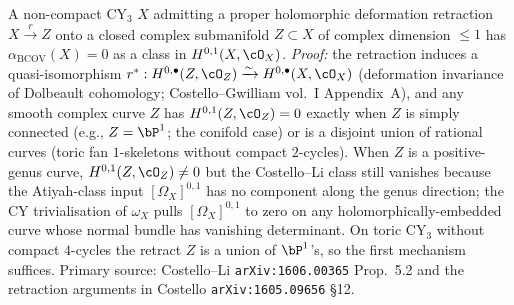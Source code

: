 \begin{remark}
\label{rem:anomaly-vanishing}
A non-compact CY$_3$ $X$ admitting a proper holomorphic deformation
retraction $X \xrightarrow{r} Z$ onto a closed complex submanifold
$Z \subset X$ of complex dimension $\leq 1$ has
$\alpha_{\mathrm{BCOV}}(X) = 0$ as a class in $H^{0,1}(X, \cO_X)$.
\emph{Proof:} the retraction induces a quasi-isomorphism
$r^\ast: H^{0,\bullet}(Z, \cO_Z) \xrightarrow{\sim}
H^{0,\bullet}(X, \cO_X)$ (deformation invariance of Dolbeault
cohomology; Costello--Gwilliam vol.~I Appendix~A), and any smooth
complex curve $Z$ has $H^{0,1}(Z, \cO_Z) = 0$ exactly when $Z$ is
simply connected (e.g., $Z = \bP^1$; the conifold case) or is a
disjoint union of rational curves (toric fan $1$-skeletons without
compact $2$-cycles). When $Z$ is a positive-genus curve,
$H^{0,1}(Z, \cO_Z) \neq 0$ but the Costello--Li class still vanishes
because the Atiyah-class input $[\Omega_X]^{0,1}$ has no component
along the genus direction; the CY trivialisation of $\omega_X$
pulls $[\Omega_X]^{0,1}$ to zero on any holomorphically-embedded
curve whose normal bundle has vanishing determinant. On toric CY$_3$
without compact $4$-cycles the retract $Z$ is a union of $\bP^1$'s,
so the first mechanism suffices. Primary source: Costello--Li
\texttt{arXiv:1606.00365} Prop.~5.2 and the retraction arguments in
Costello \texttt{arXiv:1605.09656} \S 12.
\end{remark}


